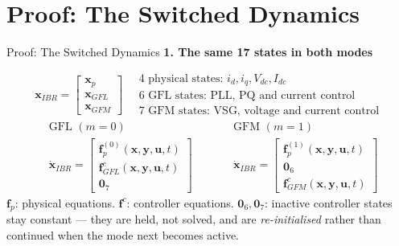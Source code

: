 \documentclass{beamer}
\begin{document}
\section{Proof: The Switched Dynamics}
\begin{frame}{Proof: The Switched Dynamics}
%
\small
\setlength{\abovedisplayskip}{7pt}
\setlength{\belowdisplayskip}{7pt}
\setlength{\abovedisplayshortskip}{5pt}
\setlength{\belowdisplayshortskip}{5pt}
\vspace*{0.10cm}
{\color{barblue}\textbf{1. The same 17 states in both modes}}\par
\vspace{0.10cm}
\begin{equation}\label{eq:fixed-state-blocks}
\bm x_{IBR}=\begin{bmatrix}
\bm x_p\\ \bm x_{GFL}\\ \bm x_{GFM}
\end{bmatrix}
\quad
\begin{array}{l}
4\text{ physical states: }i_d,i_q,V_{dc},I_{dc}\\
6\text{ GFL states: PLL, PQ and current control}\\
7\text{ GFM states: VSG, voltage and current control}
\end{array}
\end{equation}
\vspace{0.10cm}
\begin{equation}\label{eq:embedded-mode-law}
\begin{aligned}
&\text{GFL }(m=0)\\[-2pt]
&\dot{\bm x}_{IBR}=\begin{bmatrix}
\bm f_p^{(0)}(\bm x,\bm y,\bm u,t)\\
\bm f_{GFL}^{c}(\bm x,\bm y,\bm u,t)\\
\bm0_7
\end{bmatrix}
\end{aligned}
\qquad
\begin{aligned}
&\text{GFM }(m=1)\\[-2pt]
&\dot{\bm x}_{IBR}=\begin{bmatrix}
\bm f_p^{(1)}(\bm x,\bm y,\bm u,t)\\
\bm0_6\\
\bm f_{GFM}^{c}(\bm x,\bm y,\bm u,t)
\end{bmatrix}
\end{aligned}
\end{equation}
\vspace{0.06cm}
{\scriptsize $\bm f_p$: physical equations. $\bm f^c$: controller equations.
$\bm0_6,\bm0_7$: inactive controller states stay constant --- they are held, not
solved, and are \emph{re-initialised} rather than continued when the mode next
becomes active.}
\end{frame}
\end{document}
